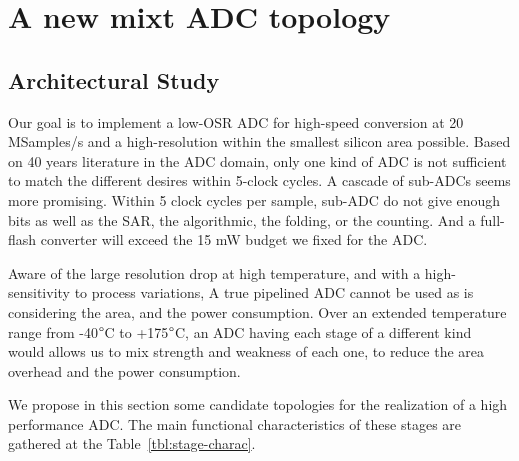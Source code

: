 \chapter{A new mixt ADC topology}
\label{sec:adc-implementation}

\ifpdf 
    \graphicspath{{Chapter4/Figs/Raster/}{Chapter4/Figs/PDF/}{Chapter4/Figs/}}
\else
    \graphicspath{{Chapter4/Figs/Vector/}{Chapter4/Figs/}}
\fi

\section{Architectural Study}
Our goal is to implement a low-OSR ADC for high-speed conversion at 20 MSamples/s and a high-resolution within the smallest silicon area possible. Based on 40 years literature in the ADC domain, only one kind of ADC is not sufficient to match the different desires within 5-clock cycles. A cascade of sub-ADCs seems more promising. Within 5 clock cycles per sample, sub-ADC do not give enough bits as well as the SAR, the algorithmic, the folding, or the counting. And a full-
flash converter will exceed the 15 mW budget we fixed for the ADC\@.

Aware of the large resolution drop at high temperature, and with a high-sensitivity to process variations, A true pipelined ADC cannot be used as is considering the area, and the power consumption. Over an extended temperature range from -40\(\degree \)C to +175\(\degree \)C, an ADC having each stage of a different kind would allows us to mix strength and weakness of each one, to reduce the area overhead and the power consumption.

We propose in this section some candidate topologies for the realization of a high performance ADC\@. The main functional characteristics of these stages are gathered at the Table~\ref{tbl:stage-charac}.

